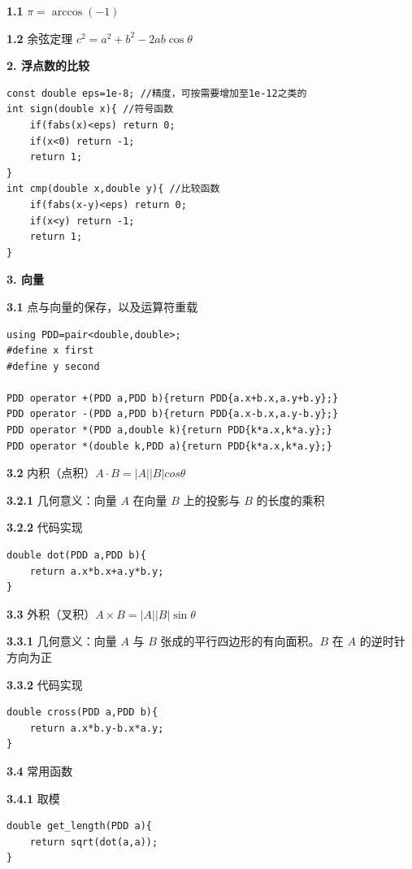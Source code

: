 \documentclass[12pt]{article}
\begin{document}
\textbf{1.1} $\pi=\arccos(-1)$
	
\textbf{1.2} 余弦定理 $c^2=a^2+b^2-2ab\cos\theta$

\textbf{2. 浮点数的比较}

\begin{lstlisting}[style=C++]
const double eps=1e-8; //精度，可按需要增加至1e-12之类的
int sign(double x){ //符号函数
	if(fabs(x)<eps) return 0;
	if(x<0) return -1;
	return 1;
}
int cmp(double x,double y){ //比较函数
	if(fabs(x-y)<eps) return 0;
	if(x<y) return -1;
	return 1;
}
\end{lstlisting}


\textbf{3. 向量}

\textbf{3.1} 点与向量的保存，以及运算符重载

\begin{lstlisting}[style=C++]
using PDD=pair<double,double>;
#define x first
#define y second

PDD operator +(PDD a,PDD b){return PDD{a.x+b.x,a.y+b.y};}
PDD operator -(PDD a,PDD b){return PDD{a.x-b.x,a.y-b.y};}
PDD operator *(PDD a,double k){return PDD{k*a.x,k*a.y};}
PDD operator *(double k,PDD a){return PDD{k*a.x,k*a.y};}
\end{lstlisting}

\textbf{3.2} 内积（点积）$A\cdot B = |A||B|cos\theta$

\textbf{3.2.1} 几何意义：向量 $A$ 在向量 $B$ 上的投影与 $B$ 的长度的乘积
		
\textbf{3.2.2} 代码实现

\begin{lstlisting}[style=C++]
double dot(PDD a,PDD b){
	return a.x*b.x+a.y*b.y;
}
\end{lstlisting}

\textbf{3.3} 外积（叉积）$A\times B=|A||B|\sin\theta$

\textbf{3.3.1} 几何意义：向量 $A$ 与 $B$ 张成的平行四边形的有向面积。$B$ 在 $A$ 的逆时针方向为正
		
\textbf{3.3.2} 代码实现

\begin{lstlisting}[style=C++]
double cross(PDD a,PDD b){
	return a.x*b.y-b.x*a.y;
}
\end{lstlisting}

\textbf{3.4} 常用函数

\textbf{3.4.1} 取模

\begin{lstlisting}[style=C++]
double get_length(PDD a){
	return sqrt(dot(a,a));
}
\end{lstlisting}
\end{document}
